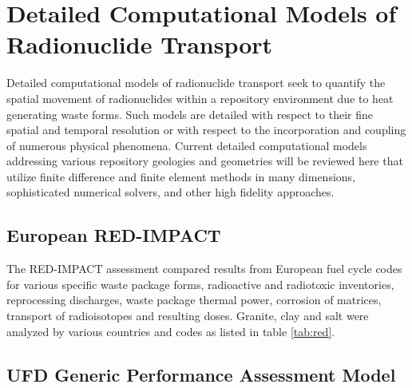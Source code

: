 \section{Detailed Computational Models of Radionuclide Transport}
\label{sec:detailed_radionuclide}

Detailed computational models of radionuclide transport seek to quantify the spatial 
movement of radionuclides within a repository environment due to heat 
generating waste forms. Such models are detailed with respect to their fine 
spatial and temporal resolution or with respect to the incorporation and 
coupling of numerous physical phenomena. Current detailed computational models 
addressing various repository geologies and geometries will be reviewed here 
that utilize finite difference and finite element methods in many dimensions, 
sophisticated numerical solvers, and other high fidelity approaches.


\subsection{European RED-IMPACT} 

The RED-IMPACT assessment compared
results from European fuel cycle codes for various specific waste package
forms, radioactive and radiotoxic inventories, reprocessing discharges,  waste
package thermal power, corrosion of matrices, transport of radioisotopes and
resulting doses.  Granite, clay and salt were analyzed by various countries and 
codes as listed in table \ref{tab:red}.







\subsection{UFD Generic Performance Assessment Model}

